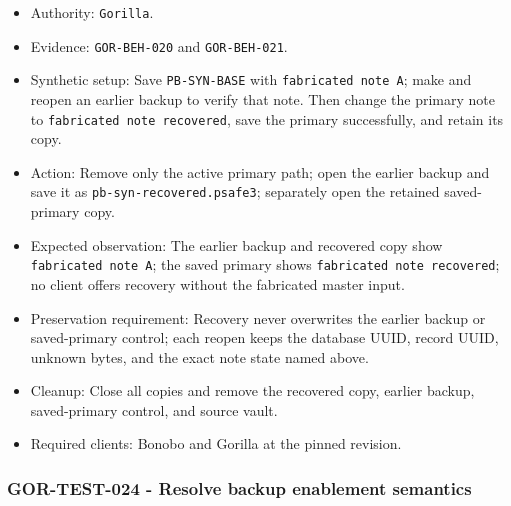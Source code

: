 \documentclass[
  letterpaper,
]{article}
\newcommand{\passthrough}[1]{#1}
\providecommand{\tightlist}{%
  \setlength{\itemsep}{0pt}\setlength{\parskip}{0pt}}
\begin{document}
\begin{itemize}
\tightlist
\item
  Authority: \passthrough{\lstinline!Gorilla!}.
\item
  Evidence: \nolinkurl{GOR-BEH-020} and \nolinkurl{GOR-BEH-021}.
\item
  Synthetic setup: Save \nolinkurl{PB-SYN-BASE} with \passthrough{\lstinline!fabricated note A!}; make and reopen an
  earlier backup to verify that note. Then change the primary note to
  \passthrough{\lstinline!fabricated note recovered!}, save the primary successfully, and retain its copy.
\item
  Action: Remove only the active primary path; open the earlier backup and save it as
  \nolinkurl{pb-syn-recovered.psafe3}; separately open the retained saved-primary copy.
\item
  Expected observation: The earlier backup and recovered copy show \passthrough{\lstinline!fabricated note A!}; the
  saved primary shows \passthrough{\lstinline!fabricated note recovered!}; no client offers recovery without the
  fabricated master input.
\item
  Preservation requirement: Recovery never overwrites the earlier backup or saved-primary control; each reopen keeps the
  database UUID, record UUID, unknown bytes, and the exact note state named above.
\item
  Cleanup: Close all copies and remove the recovered copy, earlier backup, saved-primary control, and source vault.
\item
  Required clients: Bonobo and Gorilla at the pinned revision.
\end{itemize}

\subsubsection{GOR-TEST-024 - Resolve backup enablement
semantics}\label{gor-test-024---resolve-backup-enablement-semantics}
\end{document}

